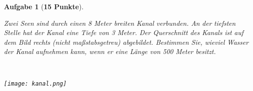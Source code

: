 \documentclass[fleqn,leqno,11pt]{scrartcl}
\theoremstyle{aufgabenstyle}
\newtheorem{aufgabe}{Aufgabe}
\begin{document}
\begin{flushleft}
\begin{aufgabe}[{\bf 15 Punkte}] ~ \\
\begin{minipage}{0.45\textwidth}
Zwei Seen sind durch einen 8 Meter breiten Kanal verbunden. An der tiefsten Stelle hat der Kanal eine Tiefe von 3 Meter. Der Querschnitt des Kanals ist auf dem Bild rechts (nicht ma\ss{}stabsgetreu) abgebildet. Bestimmen Sie, wieviel Wasser der Kanal aufnehmen kann, wenn er eine L\"ange von 500 Meter besitzt. 
\end{minipage}
\begin{minipage}{0.1\textwidth}
~
\end{minipage}
\begin{minipage}{0.35\textwidth}
\texttt{[image: kanal.png]}
\end{minipage}
\end{aufgabe}
\end{flushleft}
\end{document}
